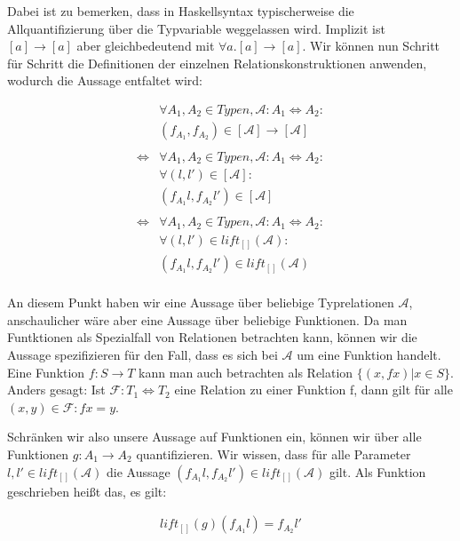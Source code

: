 \documentclass[11pt]{article} %
\begin{document}
Dabei ist zu bemerken, dass in Haskellsyntax typischerweise die Allquantifizierung über die Typvariable weggelassen wird.
Implizit ist $[a] \rightarrow [a]$ aber gleichbedeutend mit $\forall a . [a] \rightarrow [a]$.
Wir können nun Schritt für Schritt die Definitionen der einzelnen Relationskonstruktionen anwenden, wodurch die Aussage
entfaltet wird:

\begin{align*}
&\forall A_1, A_2 \in Typen, \mathcal{A} : A_1 \Leftrightarrow A_2: \\
&(f_{A_1}, f_{A_2}) \in [\mathcal{A}] \rightarrow [\mathcal{A}] \\
& \\
\Leftrightarrow &
\forall A_1, A_2 \in Typen, \mathcal{A} : A_1 \Leftrightarrow A_2: \\
& \forall (l, l') \in [\mathcal{A}]: \\
&(f_{A_1} l, f_{A_2} l') \in [\mathcal{A}] \\
& \\
\Leftrightarrow &
\forall A_1, A_2 \in Typen, \mathcal{A} : A_1 \Leftrightarrow A_2: \\
& \forall (l, l') \in lift_{[]}(\mathcal{A}): \\
& (f_{A_1} l, f_{A_2} l') \in lift_{[]}(\mathcal{A}) \\
\end{align*}

An diesem Punkt haben wir eine Aussage über beliebige Typrelationen $\mathcal{A}$, anschaulicher wäre aber eine Aussage
über beliebige Funktionen. Da man Funtktionen als Spezialfall von Relationen betrachten kann, können wir die Aussage
spezifizieren für den Fall, dass es sich bei $\mathcal{A}$ um eine Funktion handelt.
Eine Funktion $f : S \rightarrow T$ kann man auch betrachten als Relation $\{ (x, f x) | x \in S \}$. Anders gesagt: Ist
$\mathcal{F} : T_1 \Leftrightarrow T_2$ eine Relation zu einer Funktion f, dann gilt für alle $(x, y) \in \mathcal{F}: f x = y$.

Schränken wir also unsere Aussage auf Funktionen ein, können wir über alle Funktionen $g : A_1 \rightarrow A_2$ quantifizieren.
Wir wissen, dass für alle Parameter $l, l' \in lift_{[]}(\mathcal{A})$ die Aussage $(f_{A_1} l, f_{A_2} l') \in lift_{[]}(\mathcal{A})$
gilt. Als Funktion geschrieben heißt das, es gilt:

\begin{align}
lift_{[]}(g) (f_{A_1} l) = f_{A_2} l'
\end{align}
\end{document}
